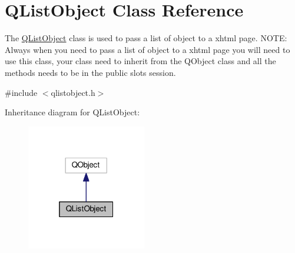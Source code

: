 \hypertarget{class_q_list_object}{}\section{Q\+List\+Object Class Reference}
\label{class_q_list_object}


The \hyperlink{class_q_list_object}{Q\+List\+Object} class is used to pass a list of object to a xhtml page. N\+O\+TE\+: Always when you need to pass a list of object to a xhtml page you will need to use this class, your class need to inherit from the Q\+Object class and all the methods needs to be in the public slots session.  




{\ttfamily \#include $<$qlistobject.\+h$>$}



Inheritance diagram for Q\+List\+Object\+:\nopagebreak
\begin{figure}[H]
\begin{center}
\leavevmode
\includegraphics[width=148pt]{class_q_list_object__inherit__graph}
\end{center}
\end{figure}
